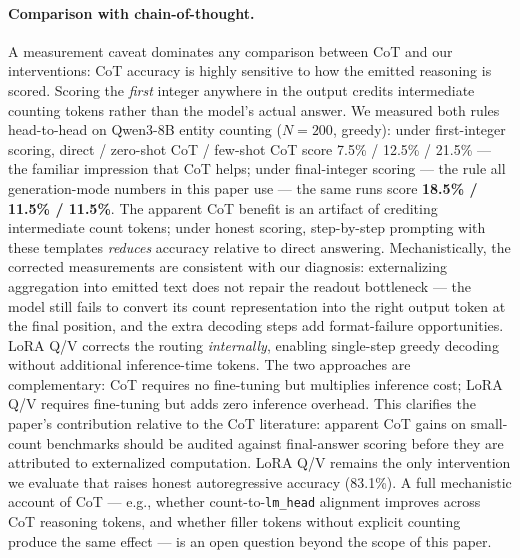 \documentclass{article}
\begin{document}
\paragraph{Comparison with chain-of-thought.}
A measurement caveat dominates any comparison between CoT and our interventions:
CoT accuracy is highly sensitive to how the emitted reasoning is scored. Scoring
the \emph{first} integer anywhere in the output credits intermediate counting
tokens rather than the model's actual answer. We measured both rules head-to-head
on Qwen3-8B entity counting ($N{=}200$, greedy): under first-integer scoring,
direct / zero-shot CoT / few-shot CoT score 7.5\% / 12.5\% / 21.5\% --- the
familiar impression that CoT helps; under final-integer scoring --- the rule all
generation-mode numbers in this paper use --- the same runs score
\textbf{18.5\% / 11.5\% / 11.5\%}. The apparent CoT benefit is an artifact of
crediting intermediate count tokens; under honest scoring, step-by-step prompting
with these templates \emph{reduces} accuracy relative to direct answering. Mechanistically, the corrected measurements are consistent with our diagnosis:
externalizing aggregation into emitted text does not repair the readout
bottleneck --- the model still fails to convert its count representation into
the right output token at the final position, and the extra decoding steps add
format-failure opportunities. LoRA Q/V corrects the routing \emph{internally}, enabling
single-step greedy decoding without additional inference-time tokens. The two
approaches are complementary: CoT requires no fine-tuning but multiplies
inference cost; LoRA Q/V requires fine-tuning but adds zero inference overhead.
This clarifies the paper's contribution relative to the CoT literature:
apparent CoT gains on small-count benchmarks should be audited against
final-answer scoring before they are attributed to externalized computation.
LoRA Q/V remains the only intervention we evaluate that raises honest
autoregressive accuracy (83.1\%). A full mechanistic account of CoT ---
e.g., whether count-to-\texttt{lm\_head} alignment improves across CoT
reasoning tokens, and whether filler tokens without explicit counting produce
the same effect --- is an open question beyond the scope of this paper.
\end{document}
